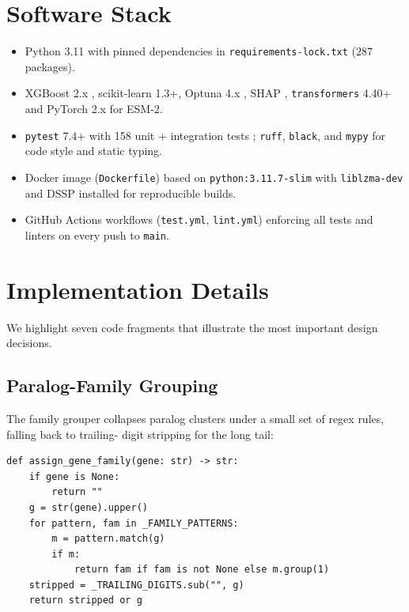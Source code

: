 \documentclass[11pt,a4paper,oneside]{report}
\begin{document}
\section{Software Stack}
\label{sec:impl-sw}

\begin{itemize}
\item Python 3.11 with pinned dependencies in
\texttt{requirements-lock.txt} ($287$ packages).
\item XGBoost 2.x \citep{chen2016xgboost}, scikit-learn
1.3+, Optuna 4.x \citep{akiba2019optuna},
SHAP \citep{lundberg2017shap},
\texttt{transformers} 4.40+ and PyTorch 2.x for
ESM-2.
\item \texttt{pytest} 7.4+ with 158 unit + integration
tests \citep{pytest2024}; \texttt{ruff}, \texttt{black},
and \texttt{mypy} for code style and static typing.
\item Docker image (\texttt{Dockerfile}) based on
\texttt{python:3.11.7-slim} with \texttt{liblzma-dev}
and DSSP installed for reproducible builds.
\item GitHub Actions workflows (\texttt{test.yml},
\texttt{lint.yml}) enforcing all tests and linters on
every push to \texttt{main}.
\end{itemize}

\section{Implementation Details}
\label{sec:impl-details}

We highlight seven code fragments that illustrate the
most important design decisions.

\subsection{Paralog-Family Grouping}
\label{sec:impl-paralog}
The family grouper collapses paralog clusters under a
small set of regex rules, falling back to trailing-
digit stripping for the long tail:

\begin{lstlisting}[caption={Paralog-family assignment in \texttt{src/data\_splitting.py}.},label={lst:family}]
def assign_gene_family(gene: str) -> str:
    if gene is None:
        return ""
    g = str(gene).upper()
    for pattern, fam in _FAMILY_PATTERNS:
        m = pattern.match(g)
        if m:
            return fam if fam is not None else m.group(1)
    stripped = _TRAILING_DIGITS.sub("", g)
    return stripped or g
\end{lstlisting}
\end{document}
